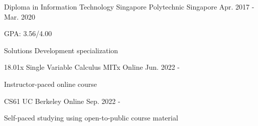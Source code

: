 

\begin{cventries}

  \cventry
    {Diploma in Information Technology} %
    {Singapore Polytechnic} %
    {Singapore} %
    {Apr. 2017 - Mar. 2020} %
    {
      \begin{cvitems} %
        \item {GPA: 3.56/4.00}
        \item {Solutions Development specialization}
      \end{cvitems}
    }

    \cventry
    {18.01x Single Variable Calculus} %
    {MITx} %
    {Online} %
    {Jun. 2022 - } %
    {
      \begin{cvitems} %
        \item {Instructor-paced online course}
      \end{cvitems}
    }

    \cventry
    {CS61} %
    {UC Berkeley} %
    {Online} %
    {Sep. 2022 - } %
    {
      \begin{cvitems} %
        \item {Self-paced studying using open-to-public course material}
      \end{cvitems}
    }
    

\end{cventries}
